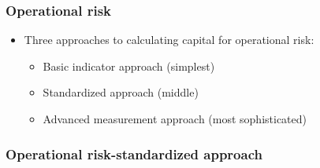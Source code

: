 \subsubsection{Operational risk}
\begin{itemize}
\item Three approaches to calculating capital for operational risk:
    \begin{itemize}
    \item Basic indicator approach (simplest)
    \item Standardized approach (middle)
    \item Advanced measurement approach (most sophisticated)
    \end{itemize}
\end{itemize}


\subsubsection{Operational risk-standardized approach}
